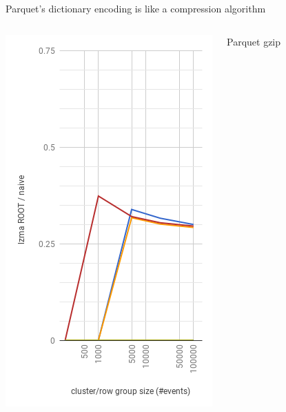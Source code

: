 \documentclass[aspectratio=169]{beamer}
\begin{document}
\begin{frame}{Parquet's dictionary encoding is like a compression algorithm}
\begin{columns}
\begin{center}
\includegraphics[width=\linewidth]{root-lzma.png}
\end{center}
\begin{center}
\mbox{\hspace{3 cm}}
Parquet gzip


\end{center}
\end{columns}
\end{frame}
\end{document}

